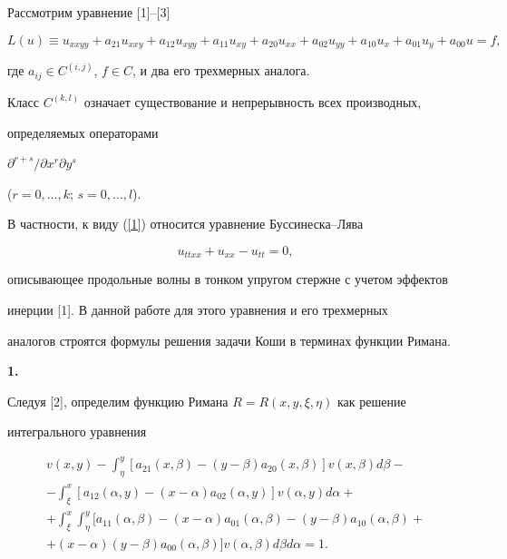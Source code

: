 \label{begin}








Рассмотрим уравнение [1]--[3]


\begin{equation}\label{1}


L(u)\equiv u_{xxyy}+a_{21}u_{xxy}+a_{12}u_{xyy}+a_{11}u_{xy}+a_{20}u_{xx}+


a_{02}u_{yy}+a_{10}u_{x}+a_{01}u_{y}+a_{00}u=f,


\end{equation}


где $a_{ij}\in C^{(i,j)}$, $f\in C$, и два его трехмерных аналога.


Класс $C^{(k,l)}$ означает существование и непрерывность всех производных,


определяемых операторами


$\partial^{r+s}/\partial x^{r} \partial y^{s}$


($r=0,\dotsc,k$; $s=0,\dotsc,l$).


В частности, к виду (\ref{1}) относится уравнение Буссинеска--Лява


$$


u_{ttxx}+u_{xx}-u_{tt}=0,


$$


описывающее продольные волны в тонком упругом стержне с учетом эффектов


инерции [1]. В данной работе для этого уравнения и его трехмерных


аналогов строятся формулы решения задачи Коши  в терминах функции Римана.


\medskip





{\bf 1.}


Следуя [2], определим функцию Римана $R=R(x,y,\xi,\eta)$ как решение


интегрального уравнения


\begin{multline}\label{2}    %


v(x,y)-\int_{\eta}^{y} [a_{21}(x,\beta)-(y-\beta)a_{20}(x,\beta)]


v(x,\beta) d\beta -\\


-\int_{\xi}^{x} [a_{12}(\alpha,y)-(x-\alpha)a_{02}(\alpha,y)]


v(\alpha,y) d\alpha+\\


+\int_{\xi}^{x} \int_{\eta}^{y} [a_{11}(\alpha,\beta)-(x-\alpha)


a_{01}(\alpha,\beta) -(y-\beta)a_{10}(\alpha,\beta)+\\


+(x-\alpha)(y-\beta)a_{00}(\alpha,\beta)]


v(\alpha,\beta) d\beta d\alpha =1.


\end{multline}


